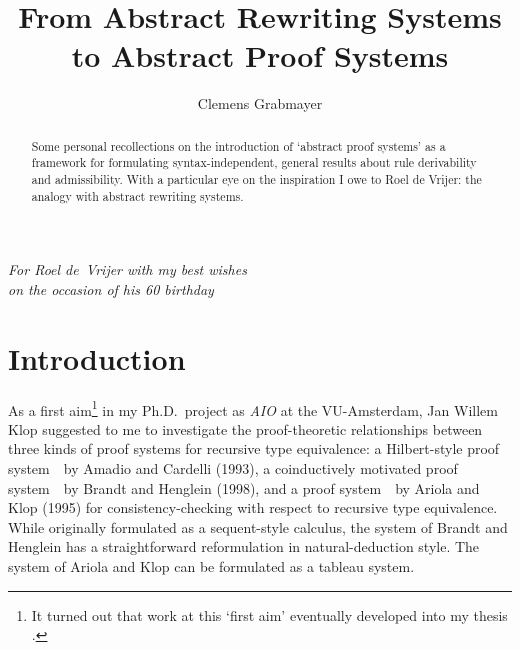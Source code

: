 \documentclass[envcountsame,runningheads]{llncs}
\newcommand{\AKeq}{} \newcommand{\ACeq}{} \newcommand{\BHeq}{}
\begin{document}
 

\title{From Abstract Rewriting Systems\\ to Abstract Proof Systems}
   
\author{Clemens Grabmayer}
\maketitle




\begin{abstract}
Some personal recollections on the introduction of `abstract
  proof systems' as a framework for formulating syntax-independent,
  general results about rule derivability and admissibility.
  With a particular eye on the inspiration I owe to Roel de Vrijer:
the analogy with abstract rewriting systems.
\end{abstract}



\begin{flushright}
\emph{For Roel de~Vrijer with my best wishes\\
        on the occasion of his 60 birthday
} 
\end{flushright}


\section{Introduction}
  \label{sec:intro}



As a first aim\footnote{It turned out that work at this `first aim' eventually
            developed into my thesis \cite{grab:2005}.}
in my Ph.D.~project as \emph{AIO} at the VU-Amsterdam,
Jan Willem Klop suggested to me to investigate the 
proof-theoretic relationships between three kinds of proof systems for 
recursive type equivalence: 
a Hilbert-style proof system~\ACeq\ by Amadio and Cardelli (1993),
a coinductively motivated proof system~\BHeq\ by Brandt and Henglein (1998),
and a proof system~\AKeq\ by Ariola and Klop (1995)
for consistency-checking with respect to recursive type equivalence.
While originally formulated as a sequent-style calculus, the system of Brandt
and Henglein has a straightforward reformulation in natural-deduction style. 
The system of Ariola and Klop can be formulated as a tableau system. 
\end{document}
